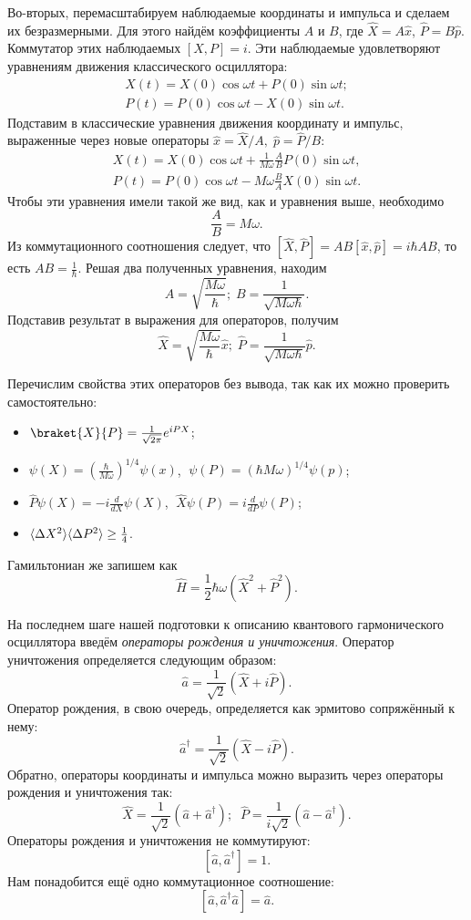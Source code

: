 Во-вторых, перемасштабируем наблюдаемые координаты и импульса и сделаем их
безразмерными. Для этого найдём коэффициенты $A$ и $B$, где $\hat{X} =
  A\hat{x}$, $\hat{P} = B\hat{p}$. Коммутатор этих наблюдаемых $\left[X, P
    \right] = i$. Эти наблюдаемые удовлетворяют уравнениям движения классического
осциллятора:
\begin{gather*}
  X(t) = X(0)\cos\omega t + P(0)\sin\omega t; \\
  P(t) = P(0)\cos \omega t - X(0) \sin\omega t.
\end{gather*}
Подставим в классические уравнения движения координату и импульс, выраженные
через новые операторы $\hat{x} = \hat{X}/A,\;\hat{p} = \hat{P}/B$:
\begin{gather*}
  X(t) = X(0)\cos \omega t + \frac{1}{M\omega}\frac{A}{B}P(0)\sin\omega t, \\
  P(t) = P(0)\cos \omega t - M\omega\frac{B}{A}X(0)\sin\omega t.
\end{gather*}
Чтобы эти уравнения имели такой же вид, как и уравнения выше, необходимо
\[
  \frac{A}{B} = M\omega.
\]
Из коммутационного соотношения следует, что $\left[\hat{X}, \hat{P}\right] =
  AB\left[\hat{x},\hat{p}\right] = i\hbar AB$, то есть $AB = \frac{1}{\hbar}$.
Решая два полученных уравнения, находим
\[
  A = \sqrt{\frac{M\omega}{\hbar}}; \; B = \frac{1}{\sqrt{M\omega \hbar}}.
\]
Подставив результат в выражения для операторов, получим
\[
  \hat{X} = \sqrt{\frac{M\omega}{\hbar}}\hat{x}; \; \hat{P} = \frac{1}{\sqrt{M\omega \hbar}}\hat{p}.
\]

Перечислим свойства этих операторов без вывода, так как их можно проверить
самостоятельно:
\begin{itemize}
  \item $\braket{X}{P} = \frac{1}{\sqrt{2\pi}}e^{iPX}$;
  \item $\psi(X) = \left(\frac{\hbar}{M\omega}\right)^{1/4}\psi(x)$, $\;\psi(P) =
          \left(\hbar M\omega \right)^{1/4}\psi(p)$;
  \item $\hat{P}\psi(X) = -i\frac{d}{dX}\psi(X)$, $\;\hat{X}\psi(P) =
          i\frac{d}{dP}\psi(P)$;
  \item $\langle \Delta X^2 \rangle\langle \Delta P^2 \rangle \geq \frac{1}{4}$.
\end{itemize}
Гамильтониан же запишем как
\[
  \hat{H} = \frac{1}{2}\hbar\omega(\hat{X}^2 + \hat{P}^2).
\]

На последнем шаге нашей подготовки к описанию квантового гармонического
осциллятора введём \textit{операторы рождения и уничтожения}. Оператор
уничтожения определяется следующим образом:
\[
  \hat{a} = \frac{1}{\sqrt{2}}\left(\hat{X} + i\hat{P} \right).
\]
Оператор рождения, в свою очередь, определяется как эрмитово сопряжённый к
нему:
\[
  \hat{a}^{\dagger} = \frac{1}{\sqrt{2}}\left(\hat{X} - i\hat{P} \right).
\]
Обратно, операторы координаты и импульса можно выразить через операторы
рождения и уничтожения так:
\[
  \hat{X} = \frac{1}{\sqrt{2}}(\hat{a} + \hat{a}^{\dagger}); \;\; \hat{P} = \frac{1}{i\sqrt{2}}(\hat{a} - \hat{a}^{\dagger}).
\]
Операторы рождения и уничтожения не коммутируют:
\[
  [\hat{a}, \hat{a}^{\dagger}] = 1.
\]
Нам понадобится ещё одно коммутационное соотношение:
\[
  [\hat{a}, \hat{a}^{\dagger}\hat{a}] = \hat{a}.
\]

